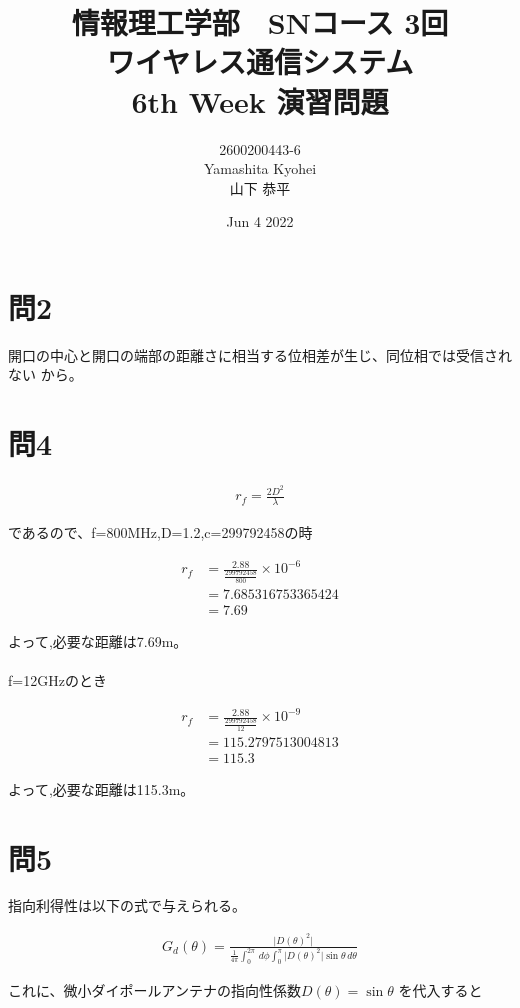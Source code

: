 \documentclass[dvipdfmx,autodetect-engine,titlepage]{jsarticle}
\title{情報理工学部　SNコース 3回\\
ワイヤレス通信システム\\
6th Week 演習問題}
\author{2600200443-6\\Yamashita Kyohei\\山下 恭平}
\date{Jun 4 2022}
\begin{document}
\maketitle

\section{問2}
開口の中心と開口の端部の距離さに相当する位相差が生じ、同位相では受信されない
から。

\section{問4}

\begin{align*}
  r_f=\frac{2D^2}{\lambda}
\end{align*}

であるので、f=800MHz,D=1.2,c=299792458の時

\begin{align*}
  r_f &= \frac{2.88}{\frac{299792458}{800}}\times10^{-6}\\
  &= 7.685316753365424\\
  &= 7.69
\end{align*}

よって,必要な距離は7.69m。\\\\

f=12GHzのとき

\begin{align*}
  r_f &= \frac{2.88}{\frac{299792458}{12}}\times10^{-9}\\
  &= 115.2797513004813\\
  &= 115.3
\end{align*}

よって,必要な距離は115.3m。


\section{問5}

指向利得性は以下の式で与えられる。

\begin{align*}
  G_{d}(\theta) = \frac{|D(\theta)^2 \vert }{\frac{1}{4\pi}\int_{0}^{2\pi}  \,d\phi\int_{0}^{\pi}|D(\theta)^2 \vert\sin\theta   \,d\theta  }
\end{align*}

これに、微小ダイポールアンテナの指向性係数\begin{math}
  D(\theta) = \sin\theta
\end{math}
を代入すると
\end{document}
